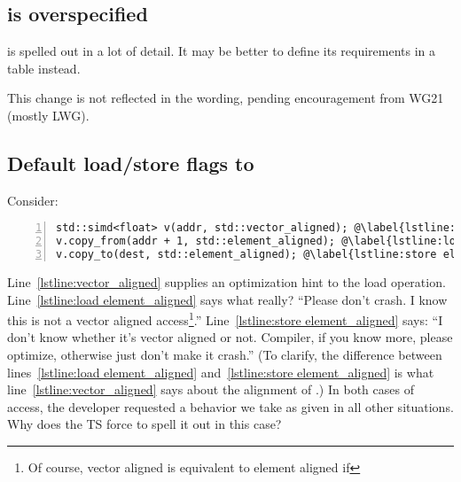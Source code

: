 
\subsection{ is overspecified}
 is spelled out in a lot of detail.
It may be better to define its requirements in a table instead.

This change is not reflected in the wording, pending encouragement from WG21 (mostly LWG).

\subsection{Default load/store flags to }

Consider:
\medskip\begin{lstlisting}[style=Vc,numbers=left]
std::simd<float> v(addr, std::vector_aligned); @\label{lstline:vector_aligned}@
v.copy_from(addr + 1, std::element_aligned); @\label{lstline:load element_aligned}@
v.copy_to(dest, std::element_aligned); @\label{lstline:store element_aligned}@
\end{lstlisting}
Line~\ref{lstline:vector_aligned} supplies an optimization hint to the load operation.
Line~\ref{lstline:load element_aligned} says what really?
“Please don't crash.
I know this is not a vector aligned access\footnote{Of course, vector aligned is equivalent to element aligned if }.”
Line~\ref{lstline:store element_aligned} says:
“I don't know whether it's vector aligned or not.
Compiler, if you know more, please optimize, otherwise just don't make it crash.”
(To clarify, the difference between lines~\ref{lstline:load element_aligned} and~\ref{lstline:store element_aligned} is what line~\ref{lstline:vector_aligned} says about the alignment of .)
In both cases of  access, the developer requested a behavior we take as given in all other situations.
Why does the TS force to spell it out in this case?


